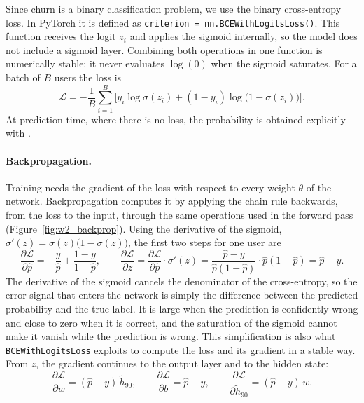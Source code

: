 \documentclass{article}
\begin{document}
Since churn is a binary classification problem, we use the binary cross-entropy loss. In PyTorch it is defined as \texttt{criterion = nn.BCEWithLogitsLoss()}. This function receives the logit $z_i$ and applies the sigmoid internally, so the model does not include a sigmoid layer. Combining both operations in one function is numerically stable: it never evaluates $\log(0)$ when the sigmoid saturates. For a batch of $B$ users the loss is
\begin{equation}
\mathcal{L} = -\frac{1}{B} \sum_{i=1}^{B} \Big[ y_i \log \sigma(z_i) + (1 - y_i) \log\big(1 - \sigma(z_i)\big) \Big].
\end{equation}
At prediction time, where there is no loss, the probability is obtained explicitly with .

\paragraph{Backpropagation.} Training needs the gradient of the loss with respect to every weight $\theta$ of the network. Backpropagation computes it by applying the chain rule backwards, from the loss to the input, through the same operations used in the forward pass (Figure~\ref{fig:w2_backprop}). Using the derivative of the sigmoid, $\sigma'(z) = \sigma(z)\big(1 - \sigma(z)\big)$, the first two steps for one user are
\begin{equation}
\frac{\partial \mathcal{L}}{\partial \hat p} = -\frac{y}{\hat p} + \frac{1 - y}{1 - \hat p},
\qquad
\frac{\partial \mathcal{L}}{\partial z} = \frac{\partial \mathcal{L}}{\partial \hat p} \cdot \sigma'(z) = \frac{\hat p - y}{\hat p (1 - \hat p)} \cdot \hat p (1 - \hat p) = \hat p - y .
\end{equation}
The derivative of the sigmoid cancels the denominator of the cross-entropy, so the error signal that enters the network is simply the difference between the predicted probability and the true label. It is large when the prediction is confidently wrong and close to zero when it is correct, and the saturation of the sigmoid cannot make it vanish while the prediction is wrong. This simplification is also what \texttt{BCEWithLogitsLoss} exploits to compute the loss and its gradient in a stable way. From $z$, the gradient continues to the output layer and to the hidden state:
\begin{equation}
\frac{\partial \mathcal{L}}{\partial w} = (\hat p - y)\, \tilde h_{90}, \qquad
\frac{\partial \mathcal{L}}{\partial b} = \hat p - y, \qquad
\frac{\partial \mathcal{L}}{\partial \tilde h_{90}} = (\hat p - y)\, w .
\end{equation}
\end{document}
